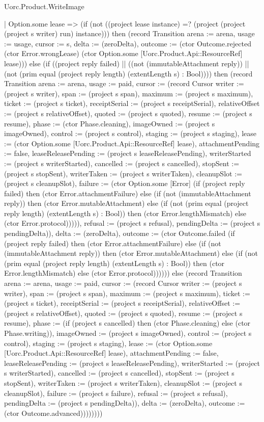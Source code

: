 \begin{lexlean}{Uorc.Product.WriteImage}
\begin{semanticmodule}
{        | Option.some lease => (if (not ((project lease instance) =? (project (project (project s writer) run) instance))) then (record Transition {arena := arena, usage := usage, cursor := s, delta := (zeroDelta), outcome := (ctor Outcome.rejected (ctor Error.wrongLease) (ctor Option.some [Uorc.Product.Api::ResourceRef] lease))}) else (if ((project reply failed) || ((not (immutableAttachment reply)) || (not (prim equal (project reply length) (extentLength s) : Bool)))) then (record Transition {arena := arena, usage := paid, cursor := (record Cursor {writer := (project s writer), span := (project s span), maximum := (project s maximum), ticket := (project s ticket), receiptSerial := (project s receiptSerial), relativeOffset := (project s relativeOffset), quoted := (project s quoted), resume := (project s resume), phase := (ctor Phase.cleaning), imageOwned := (project s imageOwned), control := (project s control), staging := (project s staging), lease := (ctor Option.some [Uorc.Product.Api::ResourceRef] lease), attachmentPending := false, leaseReleasePending := (project s leaseReleasePending), writerStarted := (project s writerStarted), cancelled := (project s cancelled), stopSent := (project s stopSent), writerTaken := (project s writerTaken), cleanupSlot := (project s cleanupSlot), failure := (ctor Option.some [Error] (if (project reply failed) then (ctor Error.attachmentFailure) else (if (not (immutableAttachment reply)) then (ctor Error.mutableAttachment) else (if (not (prim equal (project reply length) (extentLength s) : Bool)) then (ctor Error.lengthMismatch) else (ctor Error.protocol))))), refusal := (project s refusal), pendingDelta := (project s pendingDelta)}), delta := (zeroDelta), outcome := (ctor Outcome.failed (if (project reply failed) then (ctor Error.attachmentFailure) else (if (not (immutableAttachment reply)) then (ctor Error.mutableAttachment) else (if (not (prim equal (project reply length) (extentLength s) : Bool)) then (ctor Error.lengthMismatch) else (ctor Error.protocol)))))}) else (record Transition {arena := arena, usage := paid, cursor := (record Cursor {writer := (project s writer), span := (project s span), maximum := (project s maximum), ticket := (project s ticket), receiptSerial := (project s receiptSerial), relativeOffset := (project s relativeOffset), quoted := (project s quoted), resume := (project s resume), phase := (if (project s cancelled) then (ctor Phase.cleaning) else (ctor Phase.writing)), imageOwned := (project s imageOwned), control := (project s control), staging := (project s staging), lease := (ctor Option.some [Uorc.Product.Api::ResourceRef] lease), attachmentPending := false, leaseReleasePending := (project s leaseReleasePending), writerStarted := (project s writerStarted), cancelled := (project s cancelled), stopSent := (project s stopSent), writerTaken := (project s writerTaken), cleanupSlot := (project s cleanupSlot), failure := (project s failure), refusal := (project s refusal), pendingDelta := (project s pendingDelta)}), delta := (zeroDelta), outcome := (ctor Outcome.advanced)})))))))
}
\end{semanticmodule}
\end{lexlean}
